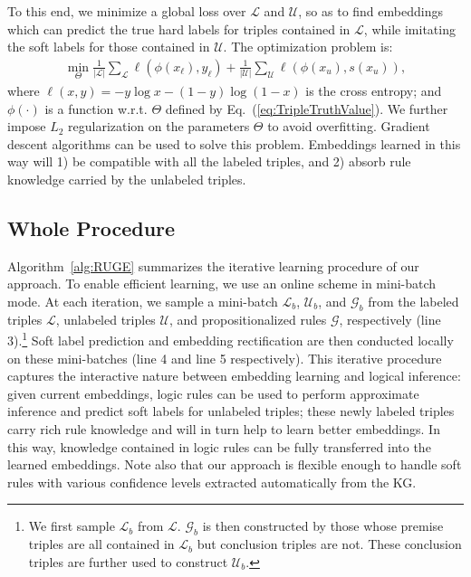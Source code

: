 \documentclass[letterpaper]{article} \usepackage{aaai18}  \usepackage{times}  \usepackage{helvet}  \usepackage{courier}  \usepackage{url}  \usepackage{graphicx}  \usepackage{amsmath}
\begin{document}
To this end, we minimize a global loss over $\mathcal{L}$ and $\mathcal{U}$, so as to find embeddings which can predict the true hard labels for triples contained in $\mathcal{L}$, while imitating the soft labels for those contained in $\mathcal{U}$. The optimization problem is:
\begin{align}\label{eq:EmbeddingRectification}
\min_{\Theta} \frac{1}{|\mathcal{L}|} \sum_{\mathcal{L}} \ell (\phi(x_\ell), y_\ell) + \frac{1}{|\mathcal{U}|}\sum_{\mathcal{U}} \ell (\phi(x_u), s(x_u)),
\end{align}
where $\ell(x,y)=-y\log x - (1-y)\log(1-x)$ is the cross entropy; and $\phi(\cdot)$ is a function w.r.t. $\Theta$ defined by Eq.~(\ref{eq:TripleTruthValue}). We further impose $L_2$ regularization on the parameters $\Theta$ to avoid overfitting. Gradient descent algorithms can be used to solve this problem. Embeddings learned in this way will 1) be compatible with all the labeled triples, and 2) absorb rule knowledge carried by the unlabeled triples.

\subsection{Whole Procedure}
Algorithm~\ref{alg:RUGE} summarizes the iterative learning procedure of our approach. To enable efficient learning, we use an online scheme in mini-batch mode. At each iteration, we sample a mini-batch $\mathcal{L}_b$, $\mathcal{U}_b$, and $\mathcal{G}_b$ from the labeled triples $\mathcal{L}$, unlabeled triples $\mathcal{U}$, and propositionalized rules $\mathcal{G}$, respectively (line 3).\footnote{We first sample $\mathcal{L}_b$ from $\mathcal{L}$. $\mathcal{G}_b$ is then constructed by those whose premise triples are all contained in $\mathcal{L}_b$ but conclusion triples are not. These conclusion triples are further used to construct $\mathcal{U}_b$.} Soft label prediction and embedding rectification are then conducted locally on these mini-batches (line 4 and line 5 respectively). This iterative procedure captures the interactive nature between embedding learning and logical inference: given current embeddings, logic rules can be used to perform approximate inference and predict soft labels for unlabeled triples; these newly labeled triples carry rich rule knowledge and will in turn help to learn better embeddings. In this way, knowledge contained in logic rules can be fully transferred into the learned embeddings. Note also that our approach is flexible enough to handle soft rules with various confidence levels extracted automatically from the KG.
\end{document}
